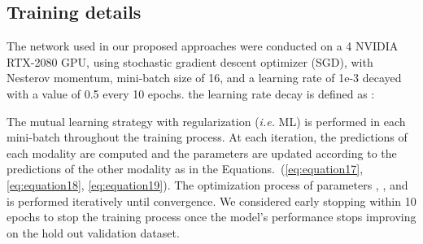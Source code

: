 \documentclass[twocolumn]{svjour3}
\newcommand{\ie}{\textit{i.e. }}
\begin{document}
\subsection{Training details} 

The network used in our proposed approaches were conducted on a 4 NVIDIA RTX-2080 GPU, using stochastic gradient descent optimizer (SGD), with Nesterov momentum, mini-batch size of 16, and a learning rate of 1e-3 decayed with a value of 0.5 every 10 epochs. the learning rate decay is defined as :

The mutual learning strategy with regularization (\ie ML) is performed in each mini-batch throughout the training process. At each iteration, the predictions of each modality are computed and the parameters are updated according to the predictions of the other modality as in the Equations.~(\ref{eq:equation17}, \ref{eq:equation18}, \ref{eq:equation19}). The optimization process of parameters , , and  is performed iteratively until convergence. We considered early stopping within 10 epochs to stop the training process once the model's performance stops improving on the hold out validation dataset.
\end{document}
